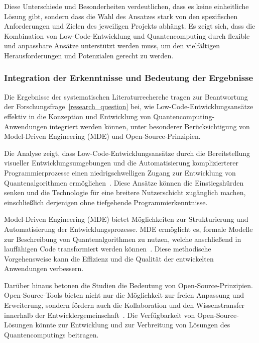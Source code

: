 Diese Unterschiede und Besonderheiten verdeutlichen, dass es keine einheitliche Lösung gibt, sondern dass die Wahl 
des Ansatzes stark von den spezifischen Anforderungen und Zielen des jeweiligen Projekts abhängt. Es zeigt sich, dass 
die Kombination von Low-Code-Entwicklung und Quantencomputing durch flexible und anpassbare Ansätze unterstützt werden 
muss, um den vielfältigen Herausforderungen und Potenzialen gerecht zu werden.

\subsubsection{Integration der Erkenntnisse und Bedeutung der Ergebnisse}

Die Ergebnisse der systematischen Literaturrecherche tragen zur Beantwortung der Forschungsfrage~\ref{research_question} bei, 
wie Low-Code-Entwicklungsansätze effektiv in die Konzeption und Entwicklung von Quantencomputing-Anwendungen 
integriert werden können, unter besonderer Berücksichtigung von Model-Driven Engineering (MDE) und Open-Source-Prinzipien.

Die Analyse zeigt, dass Low-Code-Entwicklungsansätze durch die Bereitstellung visueller Entwicklungsumgebungen 
und die Automatisierung komplizierterer Programmierprozesse einen niedrigschwelligen Zugang zur Entwicklung von 
Quantenalgorithmen ermöglichen~\cite{Sahay_2020, Bock_2021}. Diese Ansätze können die Einstiegshürden senken und 
die Technologie für eine breitere Nutzerschicht zugänglich machen, einschließlich derjenigen ohne tiefgehende 
Programmierkenntnisse.

Model-Driven Engineering (MDE) bietet Möglichkeiten zur Strukturierung und Automatisierung der Entwicklungsprozesse. 
MDE ermöglicht es, formale Modelle zur Beschreibung von Quantenalgorithmen zu nutzen, welche anschließend in 
lauffähigen Code transformiert werden können~\cite{Gemeinhardt_2021, Perez-Castillo_2022}. Diese methodische 
Vorgehensweise kann die Effizienz und die Qualität der entwickelten Anwendungen verbessern.

Darüber hinaus betonen die Studien die Bedeutung von Open-Source-Prinzipien. Open-Source-Tools bieten nicht nur 
die Möglichkeit zur freien Anpassung und Erweiterung, sondern fördern auch die Kollaboration und den Wissenstransfer 
innerhalb der Entwicklergemeinschaft~\cite{Amato_2023, Ahmad_2023}. Die Verfügbarkeit von Open-Source-Lösungen 
könnte zur Entwicklung und zur Verbreitung von Lösungen des Quantencomputings beitragen.

